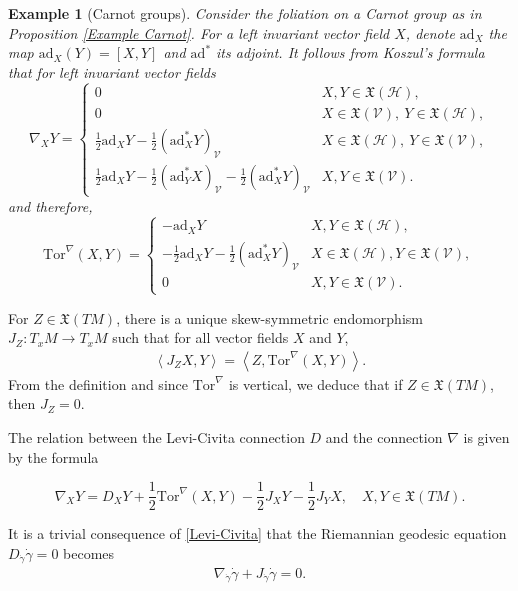 \documentclass[11pt]{article}
\numberwithin{equation}{section}
\newtheorem{example}[theorem]{Example}
\newcommand{\V}{\mathcal V}
\newcommand{\hor}{\mathcal H}
\newcommand{\ver}{\mathcal V}
\newcommand{\Tor}{\mathrm{Tor}}
\begin{document}
\begin{example}[Carnot groups]
Consider the foliation on a Carnot group as in Proposition \ref{Example Carnot}. For a left invariant vector field $X$, denote $\mathrm{ad}_X$ the map $\mathrm{ad}_X (Y)=[X,Y]$ and $\mathrm{ad}^*$ its adjoint. It follows from Koszul's formula that for left invariant vector fields
\[
\nabla_X Y =
\begin{cases}
0 &X,Y \in \mathfrak{X}(\mathcal{H}), \\
  0  &X \in \mathfrak{X}(\mathcal{V}),\ Y \in \mathfrak{X}(\mathcal{H}), \\
 \frac{1}{2} \mathrm{ad}_X Y-\frac{1}{2} (\mathrm{ad}^*_X Y)_\V   &X \in \mathfrak{X}(\mathcal{H}),\ Y \in \mathfrak{X}(\mathcal{V}), \\
 \frac{1}{2} \mathrm{ad}_X Y-\frac{1}{2} (\mathrm{ad}^*_Y X)_\V-\frac{1}{2} (\mathrm{ad}^*_X Y)_\V &X,Y \in \mathfrak{X}(\mathcal{V}).
\end{cases}
\]
and therefore, 
\begin{equation*}
\Tor^\nabla(X,Y) = \begin{cases}
- \mathrm{ad}_X Y& X,Y \in \mathfrak{X}(\hor), \\
 -\frac{1}{2} \mathrm{ad}_X Y-\frac{1}{2} (\mathrm{ad}^*_X Y)_\V  &  X \in \mathfrak{X}(\hor), Y \in \mathfrak{X}(\V), \\
0 & X,Y \in \mathfrak{X}(\ver).
\end{cases}
\end{equation*}
\end{example}

For $Z \in \mathfrak{X}(TM)$, there is a  unique skew-symmetric endomorphism  $J_Z:T_xM \to T_xM$ such that for all vector fields $X$ and $Y$,
\begin{align}\label{Jmap}
\left\langle J_Z X,Y\right\rangle= \left\langle Z,\Tor^\nabla (X,Y) \right\rangle.
\end{align}
From the definition and since $\Tor^\nabla$ is vertical, we deduce that  if $Z \in \mathfrak{X}(TM)$, then $J_Z=0$.

The relation between the Levi-Civita connection $D$  and the connection $\nabla$ is given by the formula

\begin{equation}\label{Levi-Civita}
\nabla_X Y=D_X Y+\frac{1}{2} \Tor^\nabla (X,Y)-\frac{1}{2} J_XY-\frac{1}{2} J_Y X, \quad X,Y \in \mathfrak{X}(TM).
\end{equation}

It is a trivial consequence of \eqref{Levi-Civita} that the Riemannian geodesic equation $D_{\dot\gamma} \dot\gamma=0$ becomes
\begin{align}\label{geodesic1}
\nabla_{\dot\gamma} \dot\gamma+ J_{\dot\gamma} \dot\gamma =0.
\end{align}
\end{document}
